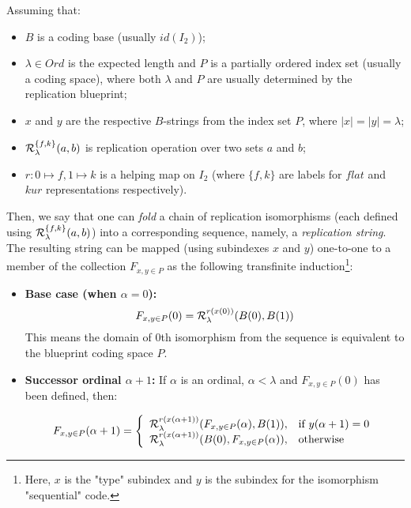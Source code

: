 \begin{definition}\label{def_fold_rep_str}
    Assuming that:
    \begin{itemize}
        \item $B$ is a coding base (usually $id(I_2)$);
        \item $\lambda \in Ord$ is the expected length and $P$ is a partially ordered index set (usually a coding space), where both $\lambda$ and $P$ are usually determined by the replication blueprint;
        \item $x$ and $y$ are the respective $B$-strings from the index set $P$, where $|x| = |y| = \lambda$;
        \item $\mathcal{R}^{\{f,k\}}_\lambda(a,b)$ is replication operation over two sets $a$ and $b$;
        \item $r: 0 \mapsto f, 1 \mapsto k$ is a helping map on $I_2$ (where $\{f,k\}$ are labels for $flat$ and $kur$ representations respectively).
    \end{itemize}
    Then, we say that one can \textit{fold} a chain of replication isomorphisms (each defined using $\mathcal{R}^{\{f,k\}}_\lambda(a,b)$) into a corresponding sequence, namely, a \textit{replication string}. The resulting string can be mapped (using subindexes $x$ and $y$) one-to-one to a member of the collection $F_{x,y \in P}$ as the following transfinite induction\footnote{Here, $x$ is the "type" subindex and $y$ is the subindex for the isomorphism "sequential" code.}:
    
    \begin{itemize}
        \item \textbf{Base case (when \( \alpha = 0 \)):}
        \[
            F_{x,y \in P}(0) = \mathcal{R}^{r(x(0))}_\lambda(B(0), B(1))
        \]
        This means the domain of 0th isomorphism from the sequence is equivalent to the blueprint coding space $P$.
    
        \item \textbf{Successor ordinal \( \alpha + 1 \):} If \( \alpha \) is an ordinal, $\alpha < \lambda$ and \( F_{x,y \in P}(0) \) has been defined, then:
        
        \begin{align*}
            F_{x,y \in P}(\alpha + 1)=\left\{
                \begin{array}{ll}
                \mathcal{R}^{r(x(\alpha + 1))}_\lambda(F_{x,y \in P}(\alpha), B(1)), & \mbox{if $y(\alpha + 1) = 0$}\\
                \mathcal{R}^{r(x(\alpha + 1))}_\lambda(B(0), F_{x,y \in P}(\alpha)), & \mbox{otherwise}
                \end{array}
            \right.
        \end{align*}


\end{itemize}
\end{definition}
